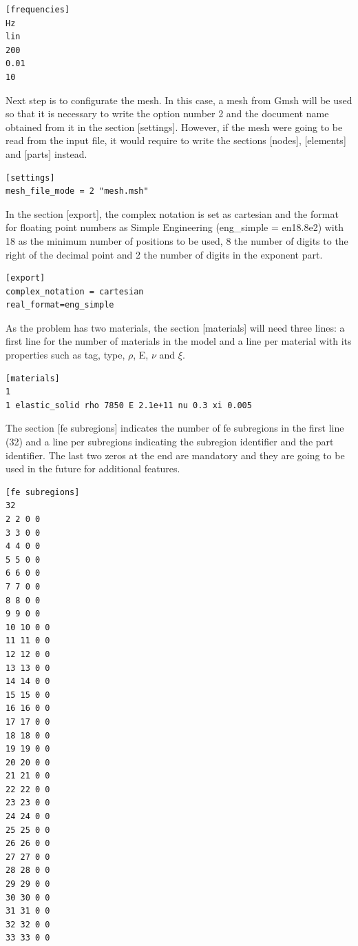 \documentclass[a4]{article}
\begin{document}
\begin{Verbatim}
[frequencies]
Hz
lin
200
0.01
10
\end{Verbatim}

Next step is to configurate the mesh. In this case, a mesh from Gmsh will be used so that it is necessary to write the option number 2 and the document name obtained from it in the section [settings]. However, if the mesh were going to be read from the input file, it would require to write the sections [nodes], [elements] and [parts] instead.

\begin{Verbatim}	
[settings]
mesh_file_mode = 2 "mesh.msh"
\end{Verbatim}

In the section [export], the complex notation is set as cartesian and the format for floating point numbers as Simple Engineering (eng\_simple = en18.8e2) with 18 as the minimum number of positions to be used, 8 the number of digits to the right of the decimal point and 2 the number of digits in the exponent part. 

\begin{Verbatim}
[export]
complex_notation = cartesian
real_format=eng_simple
\end{Verbatim}

As the problem has two materials, the section [materials] will need three lines: a first line for the number of materials in the model and a line per material with its properties such as tag, type, $\rho$, E, $\nu$ and $ \xi $.

\begin{Verbatim}
[materials]
1
1 elastic_solid rho 7850 E 2.1e+11 nu 0.3 xi 0.005
\end{Verbatim}

The section [fe subregions] indicates the number of fe subregions in the first line (32) and a line per subregions indicating the subregion identifier and the part identifier. The last two zeros at the end are mandatory and they are going to be used in the future for additional features.

\begin{Verbatim}
[fe subregions]
32
2 2 0 0
3 3 0 0
4 4 0 0
5 5 0 0
6 6 0 0
7 7 0 0
8 8 0 0
9 9 0 0
10 10 0 0
11 11 0 0
12 12 0 0
13 13 0 0
14 14 0 0
15 15 0 0
16 16 0 0
17 17 0 0
18 18 0 0
19 19 0 0
20 20 0 0
21 21 0 0
22 22 0 0
23 23 0 0
24 24 0 0
25 25 0 0
26 26 0 0
27 27 0 0
28 28 0 0
29 29 0 0
30 30 0 0
31 31 0 0
32 32 0 0
33 33 0 0
\end{Verbatim}
\end{document}
